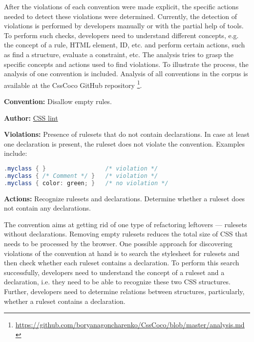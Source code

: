 After the violations of each convention were made explicit, the specific actions needed to detect
these violations were determined. Currently, the detection of violations is performed by developers
manually or with the partial help of tools. To perform such checks, developers need to understand
different concepts, e.g. the concept of a rule, HTML element, ID, etc. and perform certain actions,
such as find a structure, evaluate a constraint, etc. The analysis tries to grasp the specific
concepts and actions used to find violations. To illustrate the process, the analysis of one convention is included. Analysis of all conventions in the corpus is available at the CssCoco GitHub repository
\footnote{\url{https://github.com/boryanagoncharenko/CssCoco/blob/master/analysis.md}}.

\bigskip
\begin{boxedminipage}{.95\textwidth}
\begin{description}
\item\textbf{Convention:} Disallow empty rules.
\item\textbf{Author:} \href{https://github.com/CSSLint/csslint/wiki/Disallow-empty-rules}{CSS lint}
\item\textbf{Violations:} Presence of rulesets that do not contain declarations. In case at least one declaration is present, the ruleset does not violate the convention. Examples include:

\begin{lstlisting}[style=mono,language=Java]
.myclass { }                 /* violation */
.myclass { /* Comment */ }   /* violation */
.myclass { color: green; }   /* no violation */
\end{lstlisting}

\item\textbf{Actions:} Recognize rulesets and declarations. Determine whether a ruleset does not contain any declarations.
\end{description}
\end{boxedminipage}
\bigskip

The convention aims at getting rid of one type of refactoring leftovers ---
rulesets without declarations. Removing empty rulesets reduces the total size of CSS that
needs to be processed by the browser. One possible approach for discovering violations of the
convention at hand is to search the stylesheet for rulesets and then check whether each ruleset
contains a declaration. To perform this search successfully, developers need to understand the
concept of a ruleset and a declaration, i.e. they need to be able to recognize these two CSS
structures. Further, developers need to determine relations between structures, particularly,
whether a ruleset contains a declaration.

